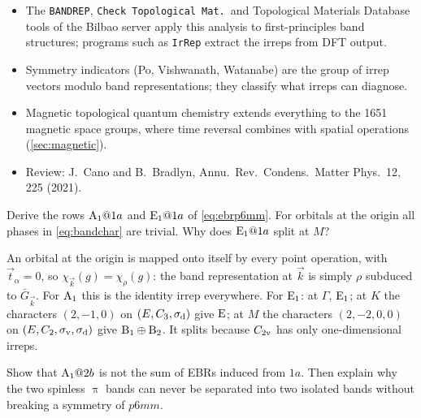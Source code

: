 \begin{beyond}
\begin{itemize}
\item The \texttt{BANDREP}, \texttt{Check Topological Mat.}\ and Topological Materials
      Database tools of the Bilbao server apply this analysis to first-principles band
      structures; programs such as \texttt{IrRep} extract the irreps from DFT output.
\item Symmetry indicators (Po, Vishwanath, Watanabe) are the group of irrep vectors
      modulo band representations; they classify what irreps can diagnose.
\item Magnetic topological quantum chemistry extends everything to the 1651 magnetic
      space groups, where time reversal combines with spatial operations
      (\cref{sec:magnetic}).
\item Review: J.\ Cano and B.\ Bradlyn, Annu.\ Rev.\ Condens.\ Matter Phys.\ 12,
      225 (2021).
\end{itemize}
\end{beyond}

\exercisesection

\begin{exercise}\label{ex:8:A1at1a}
Derive the rows $\mathrm{A}_1@1a$ and $\mathrm{E}_1@1a$ of \eqref{eq:ebrp6mm}. For orbitals
at the origin all phases in \eqref{eq:bandchar} are trivial. Why does $\mathrm{E}_1@1a$
split at $M$?
\end{exercise}

\begin{solution}
An orbital at the origin is mapped onto itself by every point operation, with
$\vec{t}_\alpha=0$, so $\chi_{\vec{k}}(g)=\chi_\rho(g)$: the band representation at $\vec{k}$ is
simply $\rho$ subduced to $\bar{G}_{\vec{k}}$. For $\mathrm{A}_1$ this is the identity irrep
everywhere. For $\mathrm{E}_1$: at $\Gamma$, $\mathrm{E}_1$; at $K$ the characters
$(2,-1,0)$ on $(E,C_3,\sigma_{\mathrm{d}})$ give $\mathrm{E}$; at $M$ the characters $(2,-2,0,0)$ on
$(E,C_2,\sigma_{\mathrm{v}},\sigma_{\mathrm{d}})$ give $\mathrm{B}_1\oplus\mathrm{B}_2$. It splits because $C_{2\mathrm{v}}$ has only
one-dimensional irreps.
\end{solution}

\begin{exercise}\label{ex:8:notsum}
Show that $\mathrm{A}_1@2b$ is not the sum of EBRs induced from $1a$. Then explain why the
two spinless $\uppi$ bands can never be separated into two isolated bands without
breaking a symmetry of $p6mm$.
\end{exercise}

